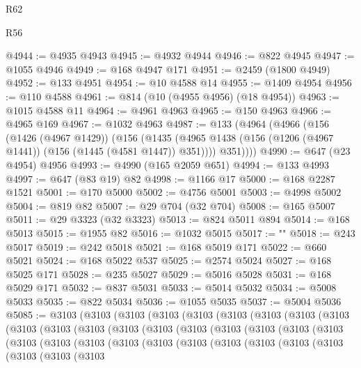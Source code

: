 \begin{lexlean}{R62}
\begin{lexlean}{R56}
\begin{coremodule}
{{{{{{{{{{{{{{{{{{{{{{{{{{{{{{{{{{{{{{{{{{{{{{{{{{{{{{{{{{{{{{{{{{{{{{{{{{{{{{{{{{{{{{{{{{{{{{{{{{{{{{{{{{{{{{{{{{{{{{{{{{{{{{{{{{{{{{{{{{{{{{{{{{{{{{{{{{{{{{{{{{{{{{{{{{{{{{{{{{{{{{{{{{{{{{{{{{{{{{{{{{{{{{{{{{{@4944 := @4935 @4943
@4945 := @4932 @4944
@4946 := @822 @4945
@4947 := @1055 @4946
@4949 := @168 @4947 @171
@4951 := @2459 (@1800 @4949)
@4952 := @133 @4951
@4954 := @10 @4588 @14
@4955 := @1409 @4954
@4956 := @110 @4588
@4961 := @814 (@10 (@4955 @4956) (@18 @4954))
@4963 := @1015 @4588 @11
@4964 := @4961 @4963
@4965 := @150 @4963
@4966 := @4965 @169
@4967 := @1032 @4963
@4987 := @133
    (@4964
      (@4966
        (@156
          (@1426 (@4967 @1429))
          (@156
            (@1435 (@4965 @1438 (@156 (@1206 (@4967 @1441)) (@156 (@1445 (@4581 @1447)) @351))))
            @351))))
@4990 := @647 (@23 @4954) @4956
@4993 := @4990 (@165 @2059 @651)
@4994 := @133 @4993
@4997 := @647 (@83 @19) @82
@4998 := @1166 @17
@5000 := @168 @2287 @1521
@5001 := @170 @5000
@5002 := @4756 @5001
@5003 := @4998 @5002
@5004 := @819 @82
@5007 := @29 @704 (@32 @704)
@5008 := @165 @5007
@5011 := @29 @3323 (@32 @3323)
@5013 := @824 @5011 @894
@5014 := @168 @5013
@5015 := @1955 @82
@5016 := @1032 @5015
@5017 := "\n"
@5018 := @243 @5017
@5019 := @242 @5018
@5021 := @168 @5019 @171
@5022 := @660 @5021
@5024 := @168 @5022 @537
@5025 := @2574 @5024
@5027 := @168 @5025 @171
@5028 := @235 @5027
@5029 := @5016 @5028
@5031 := @168 @5029 @171
@5032 := @837 @5031
@5033 := @5014 @5032
@5034 := @5008 @5033
@5035 := @822 @5034
@5036 := @1055 @5035
@5037 := @5004 @5036
@5085 := @3103
    (@3103
      (@3103
        (@3103
          (@3103
            (@3103
              (@3103
                (@3103
                  (@3103
                    (@3103
                      (@3103
                        (@3103
                          (@3103
                            (@3103
                              (@3103
                                (@3103
                                  (@3103
                                    (@3103
                                      (@3103
                                        (@3103
                                          (@3103
                                            (@3103
                                              (@3103
                                                (@3103
                                                  (@3103
                                                    (@3103
                                                      (@3103
                                                        (@3103
                                                          (@3103
                                                            (@3103
                                                              (@3103
                                                                (@3103
}}}}}}}}}}}}}}}}}}}}}}}}}}}}}}}}}}}}}}}}}}}}}}}}}}}}}}}}}}}}}}}}}}}}}}}}}}}}}}}}}}}}}}}}}}}}}}}}}}}}}}}}}}}}}}}}}}}}}}}}}}}}}}}}}}}}}}}}}}}}}}}}}}}}}}}}}}}}}}}}}}}}}}}}}}}}}}}}}}}}}}}}}}}}}}}}}}}}}}}}}}}}}}}}}}}
\end{coremodule}
\end{lexlean}
\end{lexlean}
